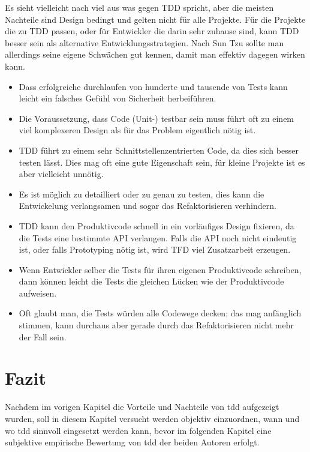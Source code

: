 \documentclass{mitschrift}
\newcommand{\pje}{\marginpar{Philipp\\Jeske}}
\begin{document}
Es sieht vielleicht nach viel aus was gegen TDD spricht, aber die meisten
Nachteile sind Design bedingt und gelten nicht für alle Projekte. Für die
Projekte die zu TDD passen, oder für Entwickler die darin sehr zuhause sind,
kann TDD besser sein als alternative Entwicklungsstrategien. Nach Sun Tzu
sollte man allerdings seine eigene Schwächen gut kennen, damit man effektiv
dagegen wirken kann.

\begin{itemize}
    \item Dass erfolgreiche durchlaufen von hunderte und tausende von Tests
        kann leicht ein falsches Gefühl von Sicherheit herbeiführen.
        \cite{StackExchange}
    \item Die Voraussetzung, dass Code (Unit-) testbar sein muss führt oft zu
        einem viel komplexeren Design als für das Problem eigentlich nötig ist.
        \cite{StackExchange}
    \item TDD führt zu einem sehr Schnittstellenzentrierten Code, da dies sich
        besser testen lässt. Dies mag oft eine gute Eigenschaft sein, für
        kleine Projekte ist es aber vielleicht unnötig.
    \item Es ist möglich zu detailliert oder zu genau zu testen, dies kann die
        Entwickelung verlangsamen und sogar das Refaktorisieren verhindern.
    \item TDD kann den Produktivcode schnell in ein vorläufiges Design fixieren,
        da die Tests eine bestimmte API verlangen. Falls die API noch nicht
        eindeutig ist, oder falls Prototyping nötig ist, wird TFD viel
        Zusatzarbeit erzeugen. \cite{StackOverflow}
    \item Wenn Entwickler selber die Tests für ihren eigenen Produktivcode
        schreiben, dann können leicht die Tests die gleichen Lücken wie der
        Produktivcode aufweisen.
    \item Oft glaubt man, die Tests würden alle Codewege decken; das mag
        anfänglich stimmen, kann durchaus aber gerade durch das Refaktorisieren
        nicht mehr der Fall sein.
\end{itemize}

\chapter{Fazit}\label{Fazit}\pje
Nachdem im vorigen Kapitel die Vorteile und Nachteile von \gls{tdd} aufgezeigt wurden,
soll in diesem Kapitel versucht werden objektiv einzuordnen, wann und wo \gls{tdd} sinnvoll
eingesetzt werden kann, bevor im folgenden Kapitel eine subjektive empirische 
Bewertung von \gls{tdd} der beiden Autoren erfolgt.
\end{document}
